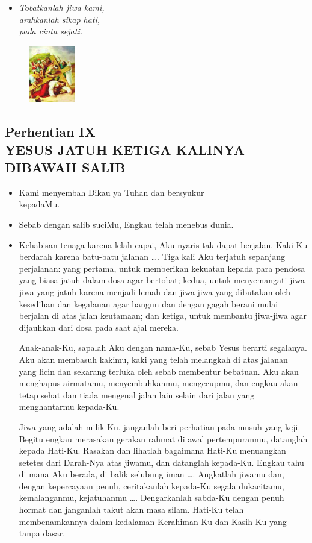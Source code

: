 \documentclass[a5paper,headsepline,titlepage,10pt,nnormalheadings,DIVcalc]{scrbook}
\newcommand{\BU}[1]{\begin{itemize} \item[U:] #1 \end{itemize}}
\newcommand{\BP}[1]{\begin{itemize} \item[P:] #1 \end{itemize}}
\newcommand{\kamiMenyembah}{\BP{ Kami menyembah Dikau ya Tuhan dan bersyukur\\kepadaMu.}
\BU{ Sebab dengan salib suciMu, Engkau telah menebus dunia.}
}
\begin{document}
\begin{itemize}
\item[9.] \it{Tobatkanlah jiwa kami, \\
	arahkanlah sikap hati,\\ 
	pada cinta sejati. 
}
\end{itemize}

\begin{figure}
\includegraphics[width=2cm]{jalansalib_files/09_small.jpg}
\end{figure}
\subsection*{Perhentian IX\\
YESUS JATUH KETIGA KALINYA DIBAWAH SALIB}

\kamiMenyembah

\BP{Kehabisan tenaga karena lelah capai, Aku nyaris tak dapat berjalan. Kaki-Ku berdarah karena batu-batu jalanan \dots . Tiga kali Aku terjatuh sepanjang perjalanan: yang pertama, untuk memberikan kekuatan kepada para pendosa yang biasa jatuh dalam dosa agar bertobat; kedua, untuk menyemangati jiwa-jiwa yang jatuh karena menjadi lemah dan jiwa-jiwa yang dibutakan oleh kesedihan dan kegalauan agar bangun dan dengan gagah berani mulai berjalan di atas jalan keutamaan; dan ketiga, untuk membantu jiwa-jiwa agar dijauhkan dari dosa pada saat ajal mereka.

Anak-anak-Ku, sapalah Aku dengan nama-Ku, sebab Yesus berarti segalanya. Aku akan membasuh kakimu, kaki yang telah melangkah di atas jalanan yang licin dan sekarang terluka oleh sebab membentur bebatuan. Aku akan menghapus airmatamu, menyembuhkanmu, mengecupmu, dan engkau akan tetap sehat dan tiada mengenal jalan lain selain dari jalan yang menghantarmu kepada-Ku.

Jiwa yang adalah milik-Ku, janganlah beri perhatian pada musuh yang keji. Begitu engkau merasakan gerakan rahmat di awal pertempuranmu, datanglah kepada Hati-Ku. Rasakan dan lihatlah bagaimana Hati-Ku menuangkan setetes dari Darah-Nya atas jiwamu, dan datanglah kepada-Ku. Engkau tahu di mana Aku berada, di balik selubung iman \dots . Angkatlah jiwamu dan, dengan kepercayaan penuh, ceritakanlah kepada-Ku segala dukacitamu, kemalanganmu, kejatuhanmu \dots . Dengarkanlah sabda-Ku dengan penuh hormat dan janganlah takut akan masa silam. Hati-Ku telah membenamkannya dalam kedalaman Kerahiman-Ku dan Kasih-Ku yang tanpa dasar.}
\end{document}
